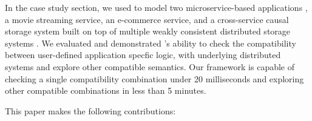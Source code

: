 
In the case study section, we used \sysname{} to model two microservice-based
applications \cite{gan2019an}, a movie streaming service, an e-commerce
service, and a cross-service causal storage system built on top of
multiple weakly consistent distributed storage systems \cite{boltoncc}.
We evaluated and demonstrated \sysname{}'s ability to check the compatibility
between user-defined application specfic logic, with underlying
distributed systems and
explore other compatible semantics. Our framework is capable of
checking a single compatibility combination under 20 milliseconds and exploring
other compatible combinations in less than 5 minutes.


This paper makes the following contributions:

